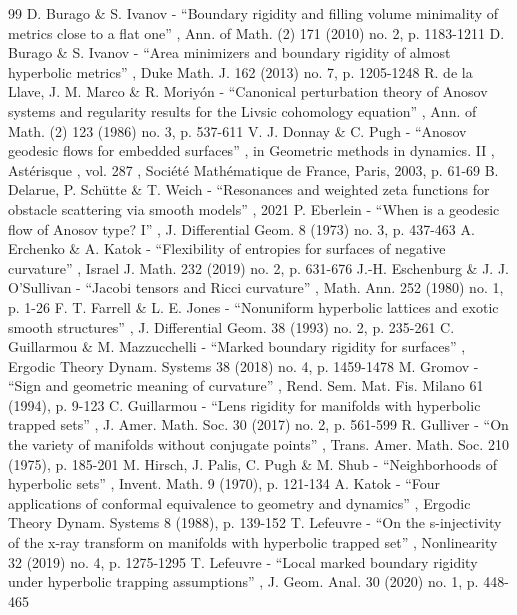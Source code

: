 \documentclass[10pt]{amsart}
\theoremstyle{definition}
\renewcommand{\>}{{\rangle}}
\newcommand{\<}{{\langle}}
\begin{document}
\begin{thebibliography}{99}
 D. Burago \& S. Ivanov - “Boundary rigidity and filling volume minimality of metrics close to a flat one” , Ann. of Math. (2) 171 (2010) no. 2, p. 1183-1211
 D. Burago \& S. Ivanov - “Area minimizers and boundary rigidity of almost hyperbolic metrics” , Duke Math. J. 162 (2013) no. 7, p. 1205-1248
 R. de la Llave, J. M. Marco \& R. Moriyón - “Canonical perturbation theory of Anosov systems and regularity results for the Livsic cohomology equation” , Ann. of Math. (2) 123 (1986) no. 3, p. 537-611
 V. J. Donnay \& C. Pugh - “Anosov geodesic flows for embedded surfaces” , in Geometric methods in dynamics. II , Astérisque , vol. 287 , Société Mathématique de France, Paris, 2003, p. 61-69
 B. Delarue, P. Schütte \& T. Weich - “Resonances and weighted zeta functions for obstacle scattering via smooth models” , 2021
 P. Eberlein - “When is a geodesic flow of Anosov type? I” , J. Differential Geom. 8 (1973) no. 3, p. 437-463
 A. Erchenko \& A. Katok - “Flexibility of entropies for surfaces of negative curvature” , Israel J. Math. 232 (2019) no. 2, p. 631-676
 J.-H. Eschenburg \& J. J. O’Sullivan - “Jacobi tensors and Ricci curvature” , Math. Ann. 252 (1980) no. 1, p. 1-26
 F. T. Farrell \& L. E. Jones - “Nonuniform hyperbolic lattices and exotic smooth structures” , J. Differential Geom. 38 (1993) no. 2, p. 235-261
 C. Guillarmou \& M. Mazzucchelli - “Marked boundary rigidity for surfaces” , Ergodic Theory Dynam. Systems 38 (2018) no. 4, p. 1459-1478
 M. Gromov - “Sign and geometric meaning of curvature” , Rend. Sem. Mat. Fis. Milano 61 (1994), p. 9-123
 C. Guillarmou - “Lens rigidity for manifolds with hyperbolic trapped sets” , J. Amer. Math. Soc. 30 (2017) no. 2, p. 561-599
 R. Gulliver - “On the variety of manifolds without conjugate points” , Trans. Amer. Math. Soc. 210 (1975), p. 185-201
 M. Hirsch, J. Palis, C. Pugh \& M. Shub - “Neighborhoods of hyperbolic sets” , Invent. Math. 9 (1970), p. 121-134
 A. Katok - “Four applications of conformal equivalence to geometry and dynamics” , Ergodic Theory Dynam. Systems 8 (1988), p. 139-152
 T. Lefeuvre - “On the s-injectivity of the x-ray transform on manifolds with hyperbolic trapped set” , Nonlinearity 32 (2019) no. 4, p. 1275-1295
 T. Lefeuvre - “Local marked boundary rigidity under hyperbolic trapping assumptions” , J. Geom. Anal. 30 (2020) no. 1, p. 448-465

\end{thebibliography}
\end{document}
